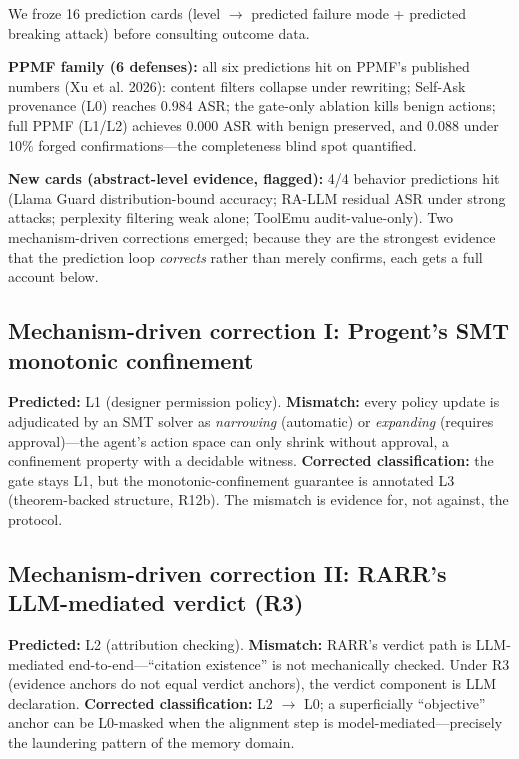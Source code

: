 \documentclass[11pt]{article}
\begin{document}
We froze 16 prediction cards (level $\rightarrow$ predicted failure mode + predicted breaking attack) before consulting outcome data.

\textbf{PPMF family (6 defenses):} all six predictions hit on PPMF's published numbers (Xu et al. 2026): content filters collapse under rewriting; Self-Ask provenance (L0) reaches 0.984 ASR; the gate-only ablation kills benign actions; full PPMF (L1/L2) achieves 0.000 ASR with benign preserved, and 0.088 under 10\% forged confirmations---the completeness blind spot quantified.

\textbf{New cards (abstract-level evidence, flagged):} 4/4 behavior predictions hit (Llama Guard distribution-bound accuracy; RA-LLM residual ASR under strong attacks; perplexity filtering weak alone; ToolEmu audit-value-only). Two mechanism-driven corrections emerged; because they are the strongest evidence that the prediction loop \emph{corrects} rather than merely confirms, each gets a full account below.

\subsection{Mechanism-driven correction I: Progent's SMT monotonic confinement}\label{mechanism-driven-correction-i-progents-smt-monotonic-confinement}

\textbf{Predicted:} L1 (designer permission policy). \textbf{Mismatch:} every policy update is adjudicated by an SMT solver as \emph{narrowing} (automatic) or \emph{expanding} (requires approval)---the agent's action space can only shrink without approval, a confinement property with a decidable witness. \textbf{Corrected classification:} the gate stays L1, but the monotonic-confinement guarantee is annotated L3 (theorem-backed structure, R12b). The mismatch is evidence for, not against, the protocol.

\subsection{Mechanism-driven correction II: RARR's LLM-mediated verdict (R3)}\label{mechanism-driven-correction-ii-rarrs-llm-mediated-verdict-r3}

\textbf{Predicted:} L2 (attribution checking). \textbf{Mismatch:} RARR's verdict path is LLM-mediated end-to-end---``citation existence'' is not mechanically checked. Under R3 (evidence anchors do not equal verdict anchors), the verdict component is LLM declaration. \textbf{Corrected classification:} L2 $\rightarrow$ L0; a superficially ``objective'' anchor can be L0-masked when the alignment step is model-mediated---precisely the laundering pattern of the memory domain.
\end{document}
